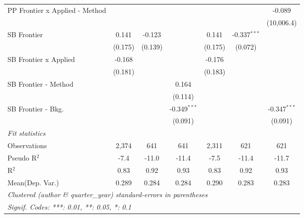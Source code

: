 \begin{tabular}{lcccccc}
   PP Frontier x Applied - Method &               &               &                &                &                & -0.089\\   
                                  &               &               &                &                &                & (10,006.4)\\   
   SB Frontier                    & 0.141         & -0.123        &                & 0.141          & -0.337$^{***}$ &   \\   
                                  & (0.175)       & (0.139)       &                & (0.175)        & (0.072)        &   \\   
   SB Frontier x Applied          & -0.168        &               &                & -0.176         &                &   \\   
                                  & (0.181)       &               &                & (0.183)        &                &   \\   
   SB Frontier - Method           &               &               & 0.164          &                &                &   \\   
                                  &               &               & (0.114)        &                &                &   \\   
   SB Frontier - Bkg.             &               &               & -0.349$^{***}$ &                &                & -0.347$^{***}$\\   
                                  &               &               & (0.091)        &                &                & (0.091)\\   
   \midrule
   \emph{Fit statistics}\\
   Observations                   & 2,374         & 641           & 641            & 2,311          & 621            & 621\\  
   Pseudo R$^2$                   & -7.4          & -11.0         & -11.4          & -7.5           & -11.4          & -11.7\\  
   R$^2$                          & 0.83          & 0.92          & 0.93           & 0.83           & 0.92           & 0.93\\  
Mean(Dep. Var.) & 0.289 & 0.284 & 0.284 & 0.290 & 0.283 & 0.283 \\
   \midrule \midrule
   \multicolumn{7}{l}{\emph{Clustered (author \& quarter\_year) standard-errors in parentheses}}\\
   \multicolumn{7}{l}{\emph{Signif. Codes: ***: 0.01, **: 0.05, *: 0.1}}\\
\end{tabular}
\par\endgroup
